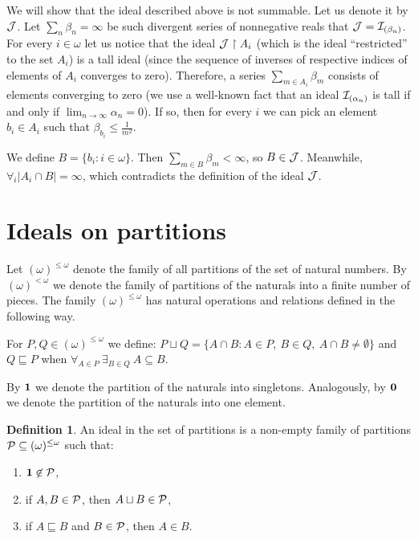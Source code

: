 \documentclass[12pt]{article}
\theoremstyle{plain}
\theoremstyle{definition}
\newtheorem{definition}[theorem]{Definition}
\theoremstyle{remark}
\newcommand{\cI}{{\cal I}}
\newcommand{\cJ}{{\cal J}}
\newcommand{\cP}{{\cal P}}
\newcommand{\Part}{(\omega)^{\leq\omega}}
\newcommand{\FinPart}{(\omega)^{<\omega}}
\begin{document}
We will show that the ideal described above is not summable. Let us denote it by $\cJ$. Let $\sum_n \beta_n = \infty$ be such divergent series of nonnegative reals that $\cJ = \cI_{(\beta_n)}$. For every $i \in \omega$ let us notice that the ideal $\cJ \restriction A_i$ (which is the ideal ``restricted'' to the set $A_i$) is a tall ideal (since the sequence of inverses of respective indices of elements of $A_i$ converges to zero). Therefore, a series $\sum_{m\in A_i} \beta_m $ consists of elements converging to zero (we use a well-known fact that an ideal $\cI_{(\alpha_n)}$ is tall if and only if $\lim_{n\to\infty} \alpha_n = 0$).
If so, then for every $i$ we can pick an element $b_i \in A_i$ such that $\beta_{b_i} \leq \frac{1}{m^2}$. 

We define $B = \lbrace {b_i\colon i\in\omega} \rbrace$. Then $\sum_{m\in B} \beta_m < \infty$, so $B \in \cJ$. Meanwhile, $\forall_{i} |A_i \cap B| = \infty$, which contradicts the definition of the ideal $\cJ$.\\


\section{Ideals on partitions}

Let $\Part$ denote the family of all partitions of the set of natural numbers. By $\FinPart$ we denote the family of partitions of the naturals into a finite number of pieces. The family $\Part$ has natural operations and relations defined in the following way.

For $P,Q \in \Part$ we define:
$P\sqcup Q = \{A \cap B \colon A \in P,\ B\in Q,\ A \cap B \not= \emptyset\}$
and $Q \sqsubseteq P$ when $\forall_{A\in P}\ \exists_{B\in Q}\ A\subseteq B$.

By ${\bf 1}$ we denote the partition of the naturals into singletons. Analogously, by ${\bf 0}$ we denote the partition of the naturals into one element.

\begin{definition}
An ideal in the set of partitions is a non-empty family of partitions $\cP \subseteq \Part$ such that:
\begin{enumerate}
\item ${\bf 1} \not\in\cP$,
\item if $A,B\in \cP$, then $A\sqcup B\in \cP$,
\item if $A \sqsubseteq B$ and $B\in \cP$, then $A\in B$.
\end{enumerate}
\end{definition}
 
\end{document}
